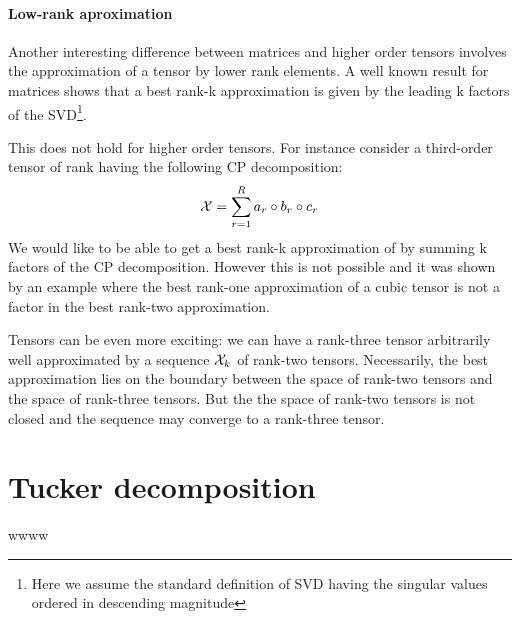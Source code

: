 \paragraph{Low-rank aproximation}
Another interesting difference between matrices and higher order tensors involves the approximation of a tensor by lower rank elements.
A well known result for matrices \cite{SVDbestapprox} shows that a best rank-k approximation is given by the leading k factors of the SVD\footnote{Here we assume the standard definition of SVD having the singular values ordered in descending magnitude}.

This does not hold for higher order tensors. For instance consider a third-order tensor of rank \R having the following CP decomposition:
\begin{equation*}
  \mathcal{X} = \sum_{r=1}^R a_r \circ b_r \circ c_r
\end{equation*}
We would like to be able to get a best rank-k approximation of \X by summing k factors of the CP decomposition. However this is not possible and it was shown by an example \cite{kolda2001orthogonal} where the best rank-one approximation of a cubic tensor is not a factor in the best rank-two approximation.

Tensors can be even more exciting: we can have a rank-three tensor \X arbitrarily well approximated by a sequence ${\mathcal{X}_k}$ of rank-two tensors. Necessarily, the best approximation lies on the boundary between the space of rank-two tensors and the space of rank-three tensors. But the the space of rank-two tensors is not closed and the sequence may converge to a rank-three tensor.  

\section{Tucker decomposition}
wwww
